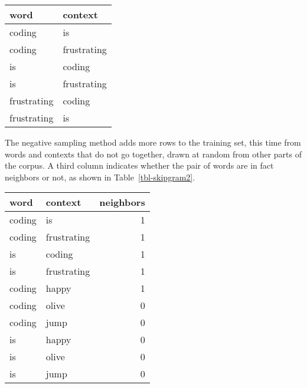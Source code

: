 \documentclass[
  man,
  floatsintext,
  longtable,
  nolmodern,
  notxfonts,
  notimes,
  colorlinks=true,linkcolor=blue,citecolor=blue,urlcolor=blue]{apa7}
\begin{document}
\begin{table}

{\caption{{Example Skipgram Training Set}{\label{tbl-skipgram1}}}
\vspace{-20pt}}

\begin{longtable}[]{@{}ll@{}}
\toprule\noalign{}
word & context \\
\midrule\noalign{}
\endhead
\bottomrule\noalign{}
\endlastfoot
coding & is \\
coding & frustrating \\
is & coding \\
is & frustrating \\
frustrating & coding \\
frustrating & is \\
\end{longtable}

\end{table}

The negative sampling method adds more rows to the training set, this
time from words and contexts that do not go together, drawn at random
from other parts of the corpus. A third column indicates whether the
pair of words are in fact neighbors or not, as shown in
Table~\ref{tbl-skipgram2}.

\begin{table}

{\caption{{Example Skipgram Training Set With Negative
Sampling}{\label{tbl-skipgram2}}}
\vspace{-20pt}}

\begin{longtable}[]{@{}llr@{}}
\toprule\noalign{}
word & context & neighbors \\
\midrule\noalign{}
\endhead
\bottomrule\noalign{}
\endlastfoot
coding & is & 1 \\
coding & frustrating & 1 \\
is & coding & 1 \\
is & frustrating & 1 \\
coding & happy & 1 \\
coding & olive & 0 \\
coding & jump & 0 \\
is & happy & 0 \\
is & olive & 0 \\
is & jump & 0 \\
\end{longtable}

\end{table}
\end{document}
